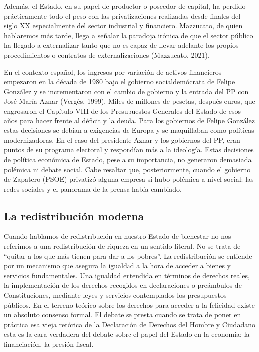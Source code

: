 \documentclass[
]{article}
\begin{document}
Además, el Estado, en su papel de productor o poseedor de capital, ha
perdido prácticamente todo el peso con las privatizaciones realizadas
desde finales del siglo XX especialmente del sector industrial y
financiero. Mazzucato, de quien hablaremos más tarde, llega a señalar la
paradoja irónica de que el sector público ha llegado a externalizar
tanto que no es capaz de llevar adelante los propios procedimientos o
contratos de externalizaciones (Mazzucato, 2021).

En el contexto español, los ingresos por variación de activos
financieros empezaron en la década de 1980 bajo el gobierno
socialdemócrata de Felipe González y se incrementaron con el cambio de
gobierno y la entrada del PP con José María Aznar (Vergés, 1999). Miles
de millones de pesetas, después euros, que engrosaron el Capítulo VIII
de los Presupuestos Generales del Estado de esos años para hacer frente
al déficit y la deuda. Para los gobiernos de Felipe González estas
decisiones se debían a exigencias de Europa y se maquillaban como
políticas modernizadoras. En el caso del presidente Aznar y los
gobiernos del PP, eran puntos de su programa electoral y respondían más
a la ideología. Estas decisiones de política económica de Estado, pese a
su importancia, no generaron demasiada polémica ni debate social. Cabe
resaltar que, posteriormente, cuando el gobierno de Zapatero (PSOE)
privatizó alguna empresa si hubo polémica a nivel social: las redes
sociales y el panorama de la prensa había cambiado.

\hypertarget{la-redistribuciuxf3n-moderna}{%
\subsection{La redistribución
moderna}\label{la-redistribuciuxf3n-moderna}}

Cuando hablamos de redistribución en nuestro Estado de bienestar no nos
referimos a una redistribución de riqueza en un sentido literal. No se
trata de ``quitar a los que más tienen para dar a los pobres''. La
redistribución se entiende por un mecanismo que asegura la igualdad a la
hora de acceder a bienes y servicios fundamentales. Una igualdad
entendida en términos de derechos reales, la implementación de los
derechos recogidos en declaraciones o preámbulos de Constituciones,
mediante leyes y servicios contemplados los presupuestos públicos. En el
terreno teórico sobre los derechos para acceder a la felicidad existe un
absoluto consenso formal. El debate se presta cuando se trata de poner
en práctica esa vieja retórica de la Declaración de Derechos del Hombre
y Ciudadano esta es la cara verdadera del debate sobre el papel del
Estado en la economía; la financiación, la presión fiscal.
\end{document}
